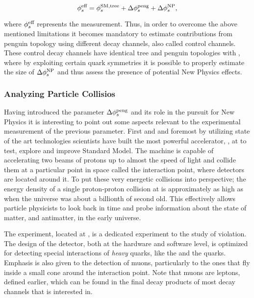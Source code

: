 \begin{equation}
\centering
 \phis^{\text {eff}} = \phis^{\tiny \text{SM,tree}} + \Delta\phiS{peng} + \Delta\phis^{\tiny \text{NP}},
 \label{app_phis_sm_peng}
\end{equation}

\noindent where $\phi_{s}^{\text {eff}}$ represents the \phis measurement.
Thus, in order to overcome the above mentioned limitations it becomes mandatory to estimate
contributions from penguin topology using different decay channels, also called control channels.
These control decay channels have identical tree and penguin topologies with \BsJpsiPhi, where
by exploiting certain quark symmetries it is possible to properly estimate the size of
$\Delta\phi_{s}^{\tiny \text{NP}}$ and thus assess the presence of potential New Physics effects.

\subsubsection{Analyzing Particle Collisios}

Having introduced the parameter $\Delta\phi_{s}^{\tiny\text{peng}}$ and its role in the pursuit for New Physics
it is interesting to point out some aspects relevant to the experimental measurement of the previous parameter.
First and and foremost by utilizing state of the art technologies scientists have built the most
powerful accelerator, \lhc, at \cern to test, explore and improve Standard Model. The machine is
capable of accelerating two beams of protons up to almost the speed of light and collide them at
a particular point in space called the interaction point, where detectors are located around it.
To put these very energetic collisions into perspective; the energy density of a single proton-proton
collision at \lhc is approximately as high as when the universe was about a billionth of second old.
This effectively allows particle physicists to look back in time and probe information about the
state of matter, and antimatter, in the early universe.

The \lhcb experiment, located at \cern, is a dedicated experiment to the study of \CP violation.
The design of the detector, both at the hardware and software level, is optimized for detecting
special interactions of {\it heavy} quarks, like the \bquark and the \cquark quarks.
Emphasis is also given to the detection of muons, particularly to the ones that fly
inside a small cone around the interaction point. Note that muons are leptons, defined earlier,
which can be found in the final decay products of most decay channels that \lhcb is interested in.

